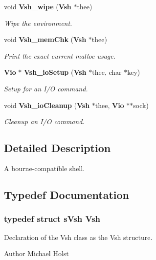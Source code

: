 \begin{DoxyCompactItemize}
void {\bf Vsh\_\-wipe} ({\bf Vsh} $\ast$thee)
\begin{DoxyCompactList}\small\item\em Wipe the environment. \item\end{DoxyCompactList}\item 
void {\bf Vsh\_\-memChk} ({\bf Vsh} $\ast$thee)
\begin{DoxyCompactList}\small\item\em Print the exact current malloc usage. \item\end{DoxyCompactList}\item 
{\bf Vio} $\ast$ {\bf Vsh\_\-ioSetup} ({\bf Vsh} $\ast$thee, char $\ast$key)
\begin{DoxyCompactList}\small\item\em Setup for an I/O command. \item\end{DoxyCompactList}\item 
void {\bf Vsh\_\-ioCleanup} ({\bf Vsh} $\ast$thee, {\bf Vio} $\ast$$\ast$sock)
\begin{DoxyCompactList}\small\item\em Cleanup an I/O command. \item\end{DoxyCompactList}\end{DoxyCompactItemize}


\subsection{Detailed Description}
A bourne-\/compatible shell. 

\subsection{Typedef Documentation}
\subsubsection[{Vsh}]{\setlength{\rightskip}{0pt plus 5cm}typedef struct {\bf sVsh} {\bf Vsh}}\label{a00027_ga12e0c622051a2ba8ed3b0609a5ae71e3}


Declaration of the Vsh class as the Vsh structure. 

\begin{DoxyAuthor}{Author}
Michael Holst 
\end{DoxyAuthor}


